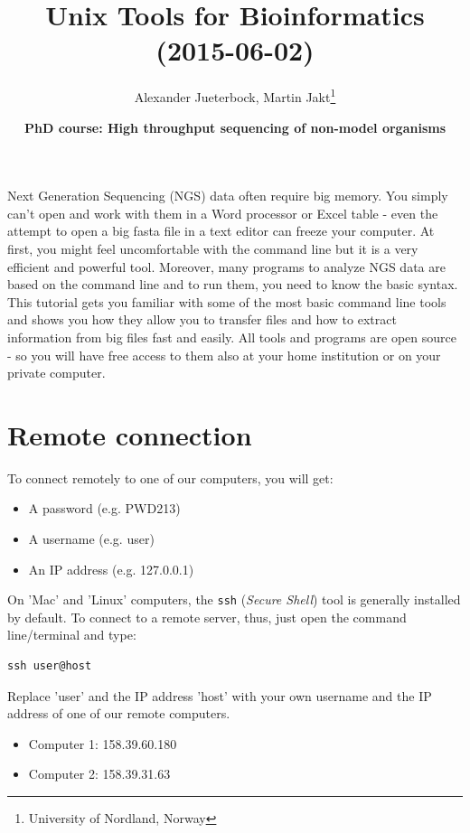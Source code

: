 \documentclass[11pt]{article}
\author{Alexander Jueterbock, Martin Jakt\thanks{University of Nordland, Norway}}
\date{\textbf{PhD course: High throughput sequencing of non-model organisms}}
\title{\textbf{Unix Tools for Bioinformatics} (2015-06-02)}
\begin{document}
\maketitle
\tableofcontents









Next Generation Sequencing (NGS) data often require big memory. You
simply can't open and work with them in a Word processor or Excel
table - even the attempt to open a big fasta file in a text editor can
freeze your computer. At first, you might feel uncomfortable with the
command line but it is a very efficient and powerful tool. Moreover,
many programs to analyze NGS data are based on the command line and to
run them, you need to know the basic syntax. This tutorial gets you
familiar with some of the most basic command line tools and shows
you how they allow you to transfer files and how to extract
information from big files fast and easily. All tools and programs are
open source - so you will have free access to them also at your home
institution or on your private computer.


\section{Remote connection}
\label{sec-1}
To connect remotely to one of our computers, you will get:

\begin{itemize}
\item A password (e.g. PWD213)
\item A username (e.g. user)
\item An IP address (e.g. 127.0.0.1)
\end{itemize}

On 'Mac' and 'Linux' computers, the \texttt{ssh} (\emph{Secure Shell}) tool is
generally installed by default. To connect to a remote server, thus,
just open the command line/terminal and type:

\begin{verbatim}
ssh user@host
\end{verbatim}


Replace 'user' and the IP address 'host' with your own
username and the IP address of one of our remote computers.
\begin{itemize}
\item Computer 1: 158.39.60.180
\item Computer 2: 158.39.31.63
\end{itemize}
\end{document}
